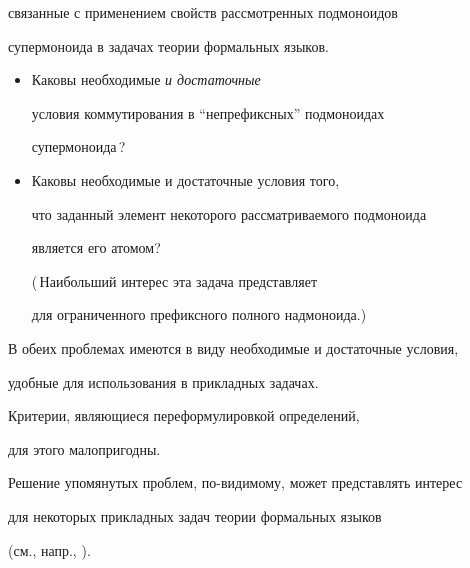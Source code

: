  связанные с применением свойств рассмотренных подмоноидов


 супермоноида в задачах теории формальных языков.





 \begin{itemize}


 \item


 Каковы необходимые {\it и достаточные\/}


 условия коммутирования в ``непрефиксных'' подмоноидах


 супермоноида\,?


 \item


 Каковы необходимые и достаточные условия того,


 что заданный элемент некоторого рассматриваемого подмоноида


 является его атомом?


 (\,Наибольший интерес эта задача представляет


 для ограниченного префиксного полного надмоноида.)


 \end{itemize}





 В обеих проблемах имеются в виду необходимые и достаточные условия,


 удобные для использования в прикладных задачах.


 Критерии, являющиеся переформулировкой определений,


 для этого малопригодны.


 Решение упомянутых проблем, по-видимому, может представлять интерес


 для некоторых прикладных задач теории формальных языков


 (см., напр., \cite{medu} \cite{mema}).











